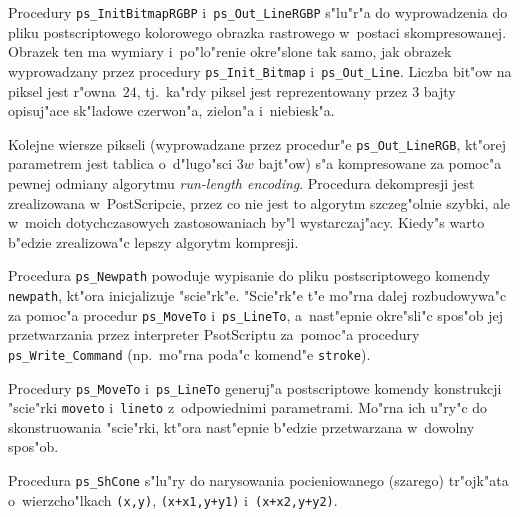 \vspace{\bigskipamount}
\begin{sloppypar}
Procedury \texttt{ps\_InitBitmapRGBP} i~\texttt{ps\_Out\_LineRGBP} s"lu"r"a do
wyprowadzenia do pliku postscriptowego kolorowego obrazka rastrowego
w~postaci skompresowanej. Obrazek ten ma wymiary i~po"lo"renie okre"slone tak
samo, jak obrazek wyprowadzany przez procedury \texttt{ps\_Init\_Bitmap}
i~\texttt{ps\_Out\_Line}. Liczba bit"ow na piksel jest r"owna~$24$, tj.\
ka"rdy piksel jest reprezentowany przez $3$ bajty opisuj"ace sk"ladowe
czerwon"a, zielon"a i~niebiesk"a.
\end{sloppypar}

Kolejne wiersze pikseli (wyprowadzane przez procedur"e
\texttt{ps\_Out\_LineRGB}, kt"orej parametrem jest tablica o~d"lugo"sci $3w$
bajt"ow) s"a kompresowane za pomoc"a pewnej odmiany algorytmu
\textsl{run-length encoding}. Procedura dekompresji jest zrealizowana
w~PostScripcie, przez co nie jest to algorytm szczeg"olnie szybki, ale
w~moich dotychczasowych zastosowaniach by"l wystarczaj"acy. Kiedy"s warto
b"edzie zrealizowa"c lepszy algorytm kompresji.

\vspace{\bigskipamount}
Procedura \texttt{ps\_Newpath} powoduje wypisanie do pliku postscriptowego
komendy \texttt{newpath}, kt"ora inicjalizuje "scie"rk"e. "Scie"rk"e t"e
mo"rna dalej rozbudowywa"c za pomoc"a procedur \texttt{ps\_MoveTo}
i~\texttt{ps\_LineTo}, a~nast"epnie okre"sli"c spos"ob jej przetwarzania
przez interpreter PsotScriptu za~pomoc"a procedury
\texttt{ps\_Write\_Command} (np.\ mo"rna poda"c komend"e \texttt{stroke}).

\vspace{\bigskipamount}
Procedury \texttt{ps\_MoveTo} i~\texttt{ps\_LineTo} generuj"a postscriptowe
komendy konstrukcji "scie"rki \texttt{moveto} i~\texttt{lineto}
z~odpowiednimi parametrami. Mo"rna ich u"ry"c do skonstruowania "scie"rki,
kt"ora nast"epnie b"edzie przetwarzana w~dowolny spos"ob.

\vspace{\bigskipamount}
Procedura \texttt{ps\_ShCone} s"lu"ry do narysowania pocieniowanego
(szarego) tr"ojk"ata o~wierzcho"lkach \texttt{(x,y)}, \texttt{(x+x1,y+y1)}
i~\texttt{(x+x2,y+y2)}.

